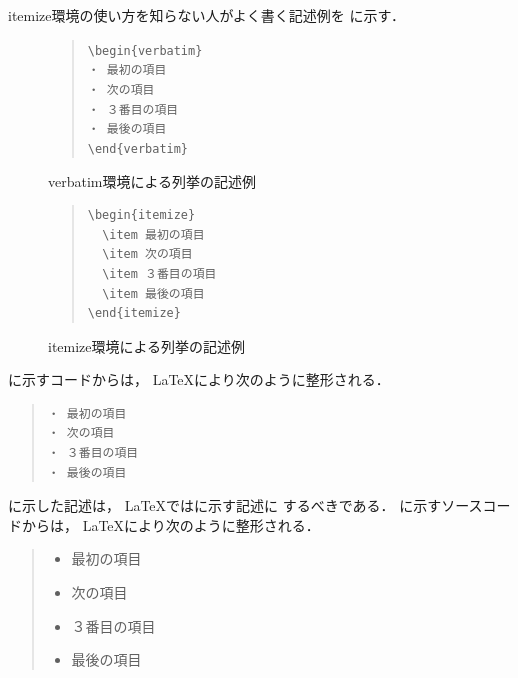 \documentclass{jarticle}[11pt]
\newcommand{\figref}[1]{\makebox{図~\ref{#1}}}
\begin{document}
itemize環境の使い方を知らない人がよく書く記述例を
\figref{fig:verbatim環境による列挙の記述例}に示す．
%
\begin{figure}[tb]
\begin{center}
\begin{quote}
\verb|\begin{verbatim}| \\
\verb|・ 最初の項目| \\
\verb|・ 次の項目| \\
\verb|・ ３番目の項目| \\
\verb|・ 最後の項目| \\
\verb|\end{verbatim}|
\end{quote}
\caption{verbatim環境による列挙の記述例}
\label{fig:verbatim環境による列挙の記述例}
\end{center}
\end{figure}
%
\begin{figure}[tb]
\begin{quote}
\begin{verbatim}
\begin{itemize}
  \item 最初の項目
  \item 次の項目
  \item ３番目の項目
  \item 最後の項目
\end{itemize}
\end{verbatim}
\end{quote}
\caption{itemize環境による列挙の記述例}
\label{fig:itemize環境による列挙の記述例}
\end{figure}
%
\figref{fig:verbatim環境による列挙の記述例}に示すコードからは，
\LaTeX により次のように整形される．
%
\begin{quote}
\begin{verbatim}
・ 最初の項目
・ 次の項目
・ ３番目の項目
・ 最後の項目
\end{verbatim}
\end{quote}

\figref{fig:verbatim環境による列挙の記述例}に示した記述は，
\LaTeX では\figref{fig:itemize環境による列挙の記述例}に示す記述に
するべきである．
\figref{fig:itemize環境による列挙の記述例}に示すソースコードからは，
\LaTeX により次のように整形される．
\begin{quote}
\begin{itemize}
  \item 最初の項目
  \item 次の項目
  \item ３番目の項目
  \item 最後の項目
\end{itemize}
\end{quote}
\end{document}
